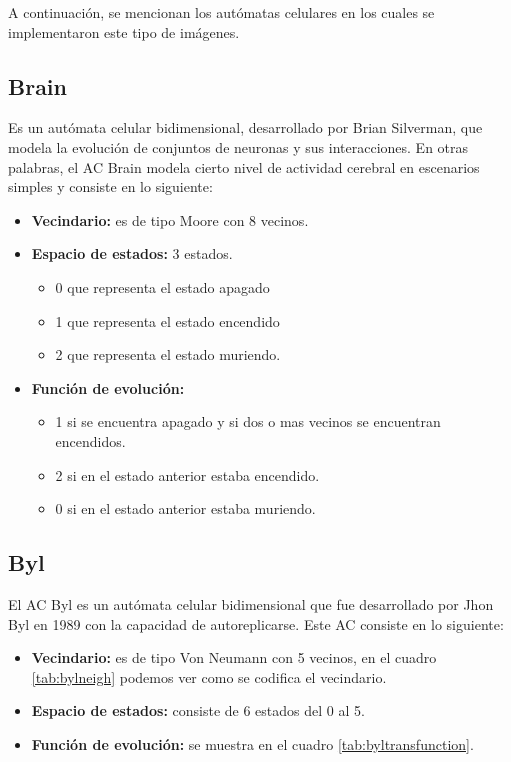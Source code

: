 A continuación, se mencionan los autómatas celulares en los cuales se implementaron este tipo de imágenes.

\subsection{Brain}

Es un autómata celular bidimensional, desarrollado por Brian Silverman, que modela la evolución de conjuntos de neuronas y sus interacciones. En otras palabras, el AC Brain modela cierto nivel de actividad cerebral en escenarios simples y consiste en lo siguiente:

\begin{itemize}
	\item \textbf{Vecindario:} es de tipo Moore con 8 vecinos.
	\item \textbf{Espacio de estados:} 3 estados.
	\begin{itemize}
		\item 0 que representa el estado apagado
		\item 1 que representa el estado encendido
		\item 2 que representa el estado muriendo.
	\end{itemize}
	\item \textbf{Función de evolución:} 
	\begin{itemize}
		\item 1 si se encuentra apagado y si dos o mas vecinos se encuentran encendidos.
		\item 2 si en el estado anterior estaba encendido.
		\item 0 si en el estado anterior estaba muriendo.
	\end{itemize}
\end{itemize}

\subsection{Byl}

El AC Byl \citep{BYL1989295} es un autómata celular bidimensional que fue desarrollado por Jhon Byl en 1989 con la capacidad de autoreplicarse. Este AC consiste en lo siguiente:

\begin{itemize}
	\item \textbf{Vecindario:} es de tipo Von Neumann con 5 vecinos, en el cuadro \ref{tab:bylneigh} podemos ver como se codifica el vecindario.
	\item \textbf{Espacio de estados:} consiste de 6 estados del 0 al 5.
	\item \textbf{Función de evolución:} se muestra en el cuadro \ref{tab:byltransfunction}.
\end{itemize}

